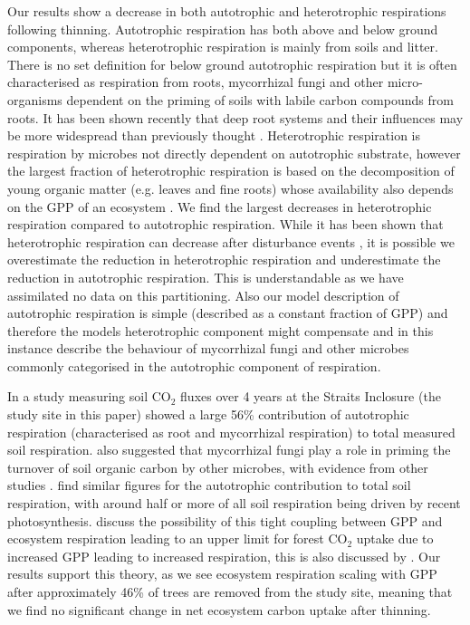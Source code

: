 \documentclass[12pt]{article}
\begin{document}
Our results show a decrease in both autotrophic and heterotrophic respirations following thinning. Autotrophic respiration has both above and below ground components, whereas heterotrophic respiration is mainly from soils and litter. There is no set definition for below ground autotrophic respiration but it is often characterised as respiration from roots, mycorrhizal fungi and other micro-organisms dependent on the priming of soils with labile carbon compounds from roots. It has been shown recently that deep root systems and their influences may be more widespread than previously thought \citep{Pierret01102016}. Heterotrophic respiration is respiration by microbes not directly dependent on autotrophic substrate, however the largest fraction of heterotrophic respiration is based on the decomposition of young organic matter (e.g. leaves and fine roots) whose availability also depends on the GPP of an ecosystem \citep{GCB:GCB412}. We find the largest decreases in heterotrophic respiration compared to autotrophic respiration. While it has been shown that heterotrophic respiration can decrease after disturbance events \citep{PCE:PCE1053}, it is possible we overestimate the reduction in heterotrophic respiration and underestimate the reduction in autotrophic respiration. This is understandable as we have assimilated no data on this partitioning. Also our model description of autotrophic respiration is simple (described as a constant fraction of GPP) and therefore the models heterotrophic component might compensate and in this instance describe the behaviour of mycorrhizal fungi and other microbes commonly categorised in the autotrophic component of respiration.   

In a study measuring soil CO\(_{2}\) fluxes over 4 years at the Straits Inclosure (the study site in this paper) \citet{heinemeyer2012exploring} showed a large 56\% contribution of autotrophic respiration (characterised as root and mycorrhizal respiration) to total measured soil respiration. \citet{heinemeyer2012exploring} also suggested that mycorrhizal fungi play a role in priming the turnover of soil organic carbon by other microbes, with evidence from other studies \citep{talbot2008decomposers}. \citet{hogberg2006towards} find similar figures for the autotrophic contribution to total soil respiration, with around half or more of all soil respiration being driven by recent photosynthesis. \citet{heinemeyer2012exploring} discuss the possibility of this tight coupling between GPP and ecosystem respiration leading to an upper limit for forest CO\(_{2}\) uptake due to increased GPP leading to increased respiration, this is also discussed by \citet{heath2005rising}. Our results support this theory, as we see ecosystem respiration scaling with GPP after approximately 46\% of trees are removed from the study site, meaning that we find no significant change in net ecosystem carbon uptake after thinning.   
\end{document}
